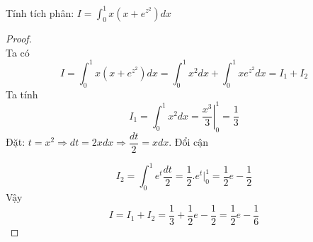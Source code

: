 \begin{dl}
	Tính tích phân: $I=\int_{0}^{1} x\left(x+e^{z^2}\right)dx$
\end{dl}
\begin{proof}~\\
	Ta có
	$$I=\int_{0}^{1} x\left(x+e^{z^2}\right)dx=\int_{0}^{1} x^2 dx+\int_{0}^{1}xe^{z^2}dx=I_1+I_2
	$$
Ta tính
	$$I_1=\int_{0}^{1} x^2dx= \left.\frac{x^3}{3}\right|_0^1=\frac{1}{3}$$
Đặt: $t=x^2\Rightarrow dt=2xdx\Rightarrow \dfrac{dt}{2}=xdx$. Đổi cận
	\begin{center}
		
	\end{center}
	$$I_2=\int_0^1 e^t\frac{dt}{2}=\frac{1}{2}\bigg.e^t\bigg|_0^1=\frac{1}{2}e-\frac{1}{2}
	$$
Vậy
	$$I=I_1+I_2=\frac{1}{3}+\frac{1}{2}e-\frac{1}{2}=\frac{1}{2}e-\frac{1}{6}$$
\end{proof}


